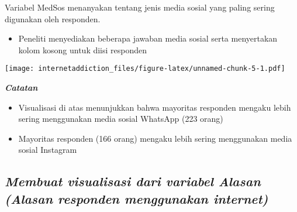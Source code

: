 \documentclass[
]{article}
\newenvironment{Shaded}{\begin{snugshade}}{\end{snugshade}}
\newcommand{\CommentTok}[1]{\textcolor[rgb]{0.56,0.35,0.01}{\textit{#1}}}
\newcommand{\DataTypeTok}[1]{\textcolor[rgb]{0.13,0.29,0.53}{#1}}
\newcommand{\KeywordTok}[1]{\textcolor[rgb]{0.13,0.29,0.53}{\textbf{#1}}}
\newcommand{\NormalTok}[1]{#1}
\newcommand{\OperatorTok}[1]{\textcolor[rgb]{0.81,0.36,0.00}{\textbf{#1}}}
\newcommand{\StringTok}[1]{\textcolor[rgb]{0.31,0.60,0.02}{#1}}
\providecommand{\tightlist}{%
  \setlength{\itemsep}{0pt}\setlength{\parskip}{0pt}}
\begin{document}
Variabel MedSos menanyakan tentang jenis media sosial yang paling sering
digunakan oleh responden.

\begin{itemize}
\tightlist
\item
  Peneliti menyediakan beberapa jawaban media sosial serta menyertakan
  kolom kosong untuk diisi responden
\end{itemize}

\begin{Shaded}
\end{Shaded}

\texttt{[image: internetaddiction\_files/figure-latex/unnamed-chunk-5-1.pdf]}

\textbf{\emph{Catatan}}

\begin{itemize}
\tightlist
\item
  Visualisasi di atas menunjukkan bahwa mayoritas responden mengaku
  lebih sering menggunakan media sosial WhatsApp (223 orang)
\item
  Mayoritas responden (166 orang) mengaku lebih sering menggunakan media
  sosial Instagram
\end{itemize}

\hypertarget{membuat-visualisasi-dari-variabel-alasan-alasan-responden-menggunakan-internet}{%
\subsection{\texorpdfstring{\emph{Membuat visualisasi dari variabel
Alasan (Alasan responden menggunakan
internet)}}{Membuat visualisasi dari variabel Alasan (Alasan responden menggunakan internet)}}\label{membuat-visualisasi-dari-variabel-alasan-alasan-responden-menggunakan-internet}}
\end{document}
